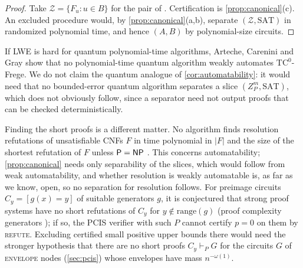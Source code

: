 \begin{proof}
Take $\mathcal Z=\{F_u:u\in B\}$ for the pair of \cite{bpr2000}. Certification is
\cref{prop:canonical}(c). An excluded procedure would, by
\cref{prop:canonical}(a,b), separate $(\mathcal Z,\mathrm{SAT})$ in randomized
polynomial time, and hence $(A,B)$ by polynomial-size circuits.
\end{proof}

If LWE is hard for quantum polynomial-time algorithms, Arteche, Carenini and Gray
\cite{acg2024} show that no polynomial-time quantum algorithm weakly automates
$\mathrm{TC}^0$-Frege. We do not claim the quantum analogue of
\cref{cor:automatability}: it would need that no bounded-error quantum algorithm
separates a slice $(Z_P^m,\mathrm{SAT})$, which does not obviously follow, since a
separator need not output proofs that can be checked deterministically.

Finding the short proofs is a different matter. No algorithm finds resolution
refutations of unsatisfiable CNFs $F$ in time polynomial in $|F|$ and the size of the
shortest refutation of $F$ unless $\mathsf{P}=\mathsf{NP}$ \cite{atserias2020automating}. This
concerns automatability; \cref{prop:canonical} needs only separability of the slices,
which would follow from weak automatability, and whether resolution is weakly
automatable is, as far as we know, open, so no separation for resolution follows. For
preimage circuits $C_y=[g(x)=y]$ of suitable generators $g$, it is conjectured that
strong proof systems have no short refutations of $C_y$ for $y\notin\mathrm{range}(g)$
(proof complexity generators \cite{abrw2004,krajicek2004dual}); if so, the PCIS
verifier with such $P$ cannot certify $p=0$ on them by \textsc{refute}. Excluding
certified small positive upper bounds there would need the stronger hypothesis that
there are no short proofs $C_y\vdash_PG$ for the circuits $G$ of \textsc{envelope}
nodes (\cref{sec:pcis}) whose envelopes have mass $n^{-\omega(1)}$.

